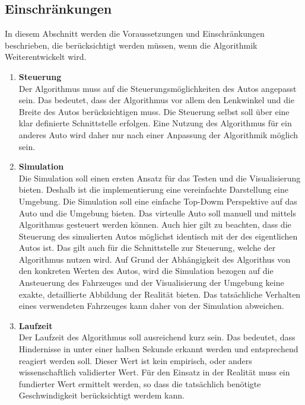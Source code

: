 \subsection{Einschränkungen}
In diesem Abschnitt werden die Voraussetzungen und Einschränkungen beschrieben, 
die berücksichtigt werden müssen, wenn die Algorithmik Weiterentwickelt wird.

\begin{enumerate}[leftmargin=*]
    \item \textbf{Steuerung} \\
    Der Algorithmus muss auf die Steuerungsmöglichkeiten des Autos angepasst sein.
    Das bedeutet, dass der Algorithmus vor allem den Lenkwinkel und die Breite des Autos berücksichtigen muss.
    Die Steuerung selbst soll über eine klar definierte Schnittstelle erfolgen.
    Eine Nutzung des Algorithmus für ein anderes Auto wird daher nur nach einer Anpassung der Algorithmik möglich sein.

    \item \textbf{Simulation} \\
    Die Simulation soll einen ersten Ansatz für das Testen und die Visualisierung bieten. 
    Deshalb ist die implementierung eine vereinfachte Darstellung eine Umgebung.
    Die Simulation soll eine einfache Top-Dowm Perspektive auf das Auto und die Umgebung bieten. 
    Das virteulle Auto soll manuell und mittels Algorithmus gesteuert werden können.
    Auch hier gilt zu beachten, dass die Steuerung des simulierten Autos möglichst identisch mit der des eigentlichen Autos ist.
    Das gilt auch für die Schnittstelle zur Steuerung, welche der Algorithmus nutzen wird.
    Auf Grund der Abhängigkeit des Algorithus von den konkreten Werten des Autos, 
    wird die Simulation bezogen auf die Ansteuerung des Fahrzeuges und der Visualisierung der Umgebung 
    keine exakte, detaillierte Abbildung der Realität bieten. Das tatsächliche Verhalten eines verwendeten Fahrzeuges 
    kann daher von der Simulation abweichen. 

    \item \textbf{Laufzeit} \\
    Der Laufzeit des Algorithmus soll ausreichend kurz sein.
    Das bedeutet, dass Hindernisse in unter einer halben Sekunde erkannt werden und entsprechend reagiert werden soll.
    Dieser Wert ist kein empirisch, oder anders wissenschaftlich validierter Wert. 
    Für den Einsatz in der Realität muss ein fundierter Wert ermittelt werden, 
    so dass die tatsächlich benötigte Geschwindigkeit berücksichtigt werdem kann.
\end{enumerate}

\newpage